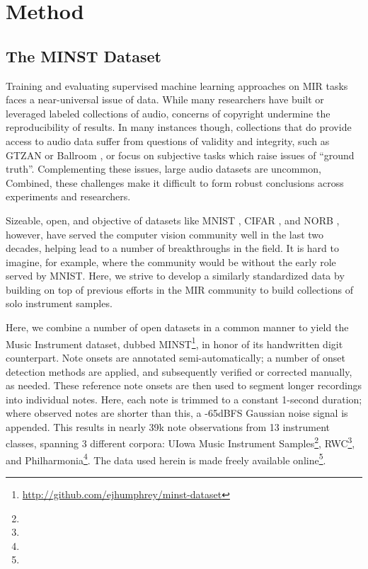 \documentclass{article}
\begin{document}
\section{Method}\label{sec:typeset_text}

\subsection{The MINST Dataset}\label{subsec:body}

Training and evaluating supervised machine learning approaches on MIR tasks faces a near-universal issue of data.
While many researchers have built or leveraged labeled collections of audio, concerns of copyright undermine the reproducibility of results.
In many instances though, collections that do provide access to audio data suffer from questions of validity and integrity, such as GTZAN \cite{Sturm} or Ballroom \cite{Sturm}, or focus on subjective tasks which raise issues of ``ground truth''.
Complementing these issues, large audio datasets are uncommon,
Combined, these challenges make it difficult to form robust conclusions across experiments and researchers.

Sizeable, open, and objective of datasets like MNIST \cite{}, CIFAR \cite{}, and NORB \cite{}, however, have served the computer vision community well in the last two decades, helping lead to a number of breakthroughs in the field.
It is hard to imagine, for example, where the community would be without the early role served by MNIST.
Here, we strive to develop a similarly standardized data by building on top of previous efforts in the MIR community to build collections of solo instrument samples.

Here, we combine a number of open datasets in a common manner to yield the Music Instrument dataset, dubbed MINST\footnote{\url{http://github.com/ejhumphrey/minst-dataset}}, in honor of its handwritten digit counterpart.
Note onsets are annotated semi-automatically;
a number of onset detection methods are applied, and subsequently verified or corrected manually, as needed.
These reference note onsets are then used to segment longer recordings into individual notes.
Here, each note is trimmed to a constant 1-second duration; where observed notes are shorter than this, a -65dBFS Gaussian noise signal is appended.
This results in nearly 39k note observations from 13 instrument classes, spanning 3 different corpora:
UIowa Music Instrument Samples\footnote{}, RWC\footnote{}, and Philharmonia\footnote{}.
The data used herein is made freely available online\footnote{}.
\end{document}
